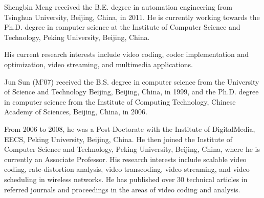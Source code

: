 \documentclass[journal,draftclsnofoot,onecolumn]{IEEEtran}
\begin{document}
\begin{IEEEbiography}{Shengbin Meng}
received the B.E. degree in automation engineering from Tsinghua University, Beijing, China, in 2011. He is currently working towards the Ph.D. degree in computer science at the Institute of Computer Science and Technology, Peking University, Beijing, China.

His current research interests include video coding, codec implementation and optimization, video streaming, and multimedia applications.
\end{IEEEbiography}

\begin{IEEEbiography}{Jun Sun}
(M’07) received the B.S. degree in computer science from the University of Science and Technology Beijing, Beijing, China, in 1999, and the Ph.D. degree in computer science from the Institute of Computing Technology, Chinese Academy of Sciences, Beijing, China, in 2006.

From 2006 to 2008, he was a Post-Doctorate with the Institute of DigitalMedia, EECS, Peking University, Beijing, China. He then joined the Institute of Computer Science and Technology, Peking University, Beijing, China, where he is currently an Associate Professor. His research interests include scalable video coding, rate-distortion analysis, video transcoding, video streaming, and video scheduling in wireless networks. He has published over 30 technical articles in referred journals and proceedings in the areas of video coding and analysis.
\end{IEEEbiography}
\end{document}
